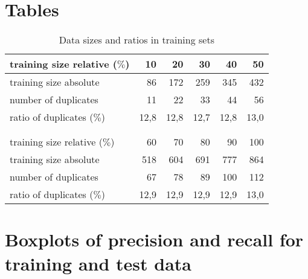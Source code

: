 \documentclass[conference]{IEEEtran}
\begin{document}
	\section{Tables}\label{tableappendix}
	\begin{table}[H]
	\centering
	\begin{tabular}{lrrrrr}
	training size relative ($\%$)	  &  10&  20&  30&  40&  50\\
	\midrule                                                     
	training size absolute 			  &  86& 172& 259& 345& 432\\
	number of duplicates	  		  &  11&  22&  33&  44&  56\\                                                   
	ratio of duplicates ($\%$)        &12,8&12,8&12,7&12,8&13,0\\
	\\\\
	training size relative ($\%$)	  &  60&  70&  80&  90& 100\\
	\midrule
	training size absolute 			  & 518& 604& 691& 777& 864\\
	number of duplicates	  		  &  67&  78&  89& 100& 112\\
	ratio of duplicates ($\%$)        &12,9&12,9&12,9&12,9&13,0\\
	\end{tabular}
	\caption{Data sizes and ratios in training sets}\label{ratios}
	\end{table}
	
	\section{Boxplots of precision and recall for training and test data}\label{figureappendix}
	
	\newpage \null\newpage
	
\end{document}
